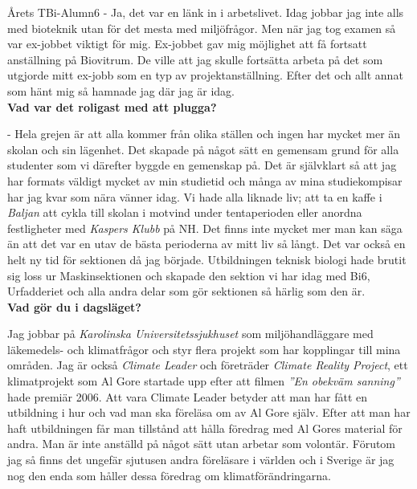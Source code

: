 \begin{news}{2}{Årets TBi-Alumn}{}{}{6}{}
 - Ja, det var en länk in i arbetslivet. Idag jobbar jag inte alls med bioteknik 
utan för det mesta med miljöfrågor. Men när jag tog examen så var ex-jobbet 
viktigt för mig. Ex-jobbet gav mig möjlighet att få fortsatt anställning på 
Biovitrum. De ville att jag skulle fortsätta arbeta på det som utgjorde mitt 
ex-jobb som en typ av projektanställning. Efter det och allt annat som hänt 
mig så hamnade jag där jag är idag. 
\\

\noindent \textbf{Vad var det roligast med att plugga?}

 - Hela grejen är att alla kommer från olika ställen och ingen har mycket mer än 
skolan och sin lägenhet. Det skapade på något sätt en gemensam grund för alla 
studenter som vi därefter byggde en gemenskap på. Det är självklart så att 
jag har formats väldigt mycket av min studietid och många av mina 
studiekompisar har jag kvar som nära vänner idag. Vi hade alla liknade liv; 
att ta en kaffe i \emph{Baljan} att cykla till skolan i motvind under tentaperioden 
eller anordna festligheter med \emph{Kaspers Klubb} på NH. Det finns inte mycket mer 
man kan säga än att det var en utav de bästa perioderna av mitt liv så långt. 
Det var också en helt ny tid för sektionen då jag började. Utbildningen 
teknisk biologi hade brutit sig loss ur Maskinsektionen och skapade den 
sektion vi har idag med Bi6, Urfadderiet och alla andra delar som gör 
sektionen så härlig som den är.  
\\

\noindent \textbf{Vad gör du i dagsläget?}

Jag jobbar på \emph{Karolinska Universitetssjukhuset} som miljöhandläggare med 
läkemedels- och klimatfrågor och styr flera projekt som har kopplingar till 
mina områden. Jag är också \emph{Climate Leader} och företräder \emph{Climate 
Reality Project}, ett klimatprojekt som Al Gore startade upp efter att filmen \emph{''En 
obekväm sanning''} hade premiär 2006. Att vara Climate Leader betyder att 
man har fått en utbildning i hur och vad man ska föreläsa om av Al Gore 
själv. Efter att man har haft utbildningen får man tillstånd att hålla 
föredrag med Al Gores material för andra. Man är inte anställd på något sätt 
utan arbetar som volontär. Förutom jag så finns det ungefär sjutusen andra 
föreläsare i världen och i Sverige är jag nog den enda som håller dessa 
föredrag om klimatförändringarna. 

\end{news}
